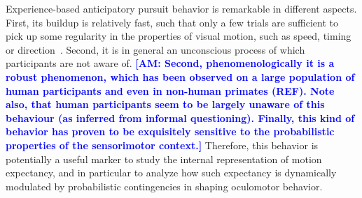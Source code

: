 \documentclass[10pt,letterpaper]{article}
\newcommand{\citep}[1]{\cite{#1}}
\newcommand{\AM}[1]{\textbf{\textcolor{blue}{[AM: #1]}}}
\begin{document}
Experience-based anticipatory pursuit behavior is remarkable
in different aspects.
First, its buildup is relatively fast, such that only a few trials are sufficient
to pick up some regularity in the properties of visual motion, such as speed, timing or direction~\citep{Kowler1984,Maus2015,Deravet_JOV2018}.
Second, it is in general an unconscious process
of which participants are not aware of.
\AM{Second, phenomenologically it is a robust phenomenon, which has been observed on a large population of human participants and even in non-human primates (REF). Note also, that human participants seem to be largely unaware of this behaviour (as inferred from informal questioning). Finally, this kind of behavior has proven to be exquisitely sensitive to the probabilistic properties of the sensorimotor context.}
Therefore, this behavior is potentially a useful marker
to study the internal representation of motion expectancy, %
and in particular to analyze how such expectancy
is dynamically modulated by probabilistic contingencies in shaping oculomotor behavior.
\end{document}
